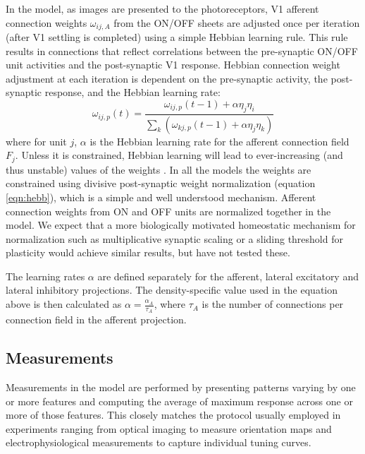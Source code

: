 In the model, as images are presented to
the photoreceptors, V1 afferent connection weights $\omega_{ij,A}$
from the ON/OFF sheets are adjusted once per iteration (after V1
settling is completed) using a simple Hebbian learning rule. This rule
results in connections that reflect correlations between the
pre-synaptic ON/OFF unit activities and the post-synaptic V1 response.
Hebbian connection weight adjustment at each iteration is dependent on
the pre-synaptic activity, the post-synaptic response, and the Hebbian
learning rate:
\begin{equation}
\omega_{ij,p}(t)=\frac{\omega_{ij,p}(t-1)+\alpha\eta_{j}\eta_{i}}{\sum_{k}\left(\omega_{kj,p}(t-1)+\alpha\eta_{j}\eta_{k}\right)}
\label{eqn:hebb}
\end{equation}
where for unit $j$, $\alpha$ is the Hebbian learning rate for the
afferent connection field $F_{j}$. Unless it is constrained, Hebbian
learning will lead to ever-increasing (and thus unstable) values of
the weights \citep{Rochester1956}. In all the models the weights are
constrained using divisive post-synaptic weight normalization
(equation \ref{eqn:hebb}), which is a simple and well understood
mechanism. Afferent connection weights from ON and OFF units are
normalized together in the model. We expect that a more biologically
motivated homeostatic mechanism for normalization such as
multiplicative synaptic scaling
\citep{Turrigiano1999,Turrigiano2004,Sullivan2006} or a sliding
threshold for plasticity \citep{Bienenstock1982} would achieve similar
results, but have not tested these.

The learning rates $\alpha$ are defined separately for the afferent,
lateral excitatory and lateral inhibitory projections. The
density-specific value used in the equation above is then calculated
as $\alpha=\frac{\alpha_{A}}{\tau_{A}}$, where $\tau_{A}$ is the
number of connections per connection field in the afferent projection.


\subsection{Measurements}

Measurements in the model are performed by presenting patterns varying
by one or more features and computing the average of maximum response
across one or more of those features. This closely matches the
protocol usually employed in experiments ranging from optical imaging
to measure orientation maps and electrophysiological measurements to
capture individual tuning curves.

